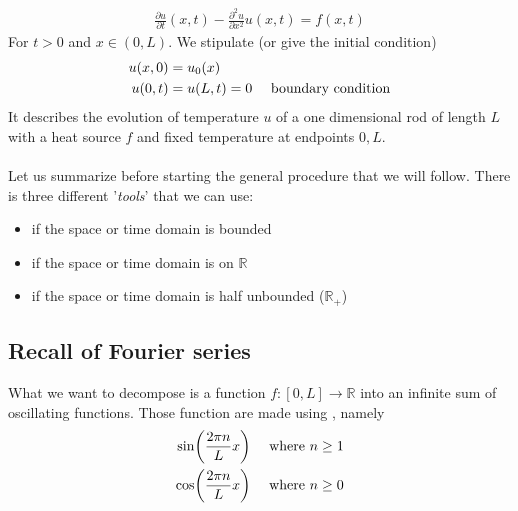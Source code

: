\begin{align*} 
	\frac{\partial u}{\partial t} \left(x, t\right) - \frac{\partial^2 u}{\partial x^2} u\left(x, t\right) = f\left(x, t\right)
\end{align*}
For $t > 0$ and $x \in \left(0, L\right)$. We stipulate (or give the initial condition)
\begin{align*} 
	u\left(x, 0\right) &= u_0\left(x\right)\\
	u\left(0, t\right) &= u\left(L, t\right) = 0 \mathspace \text{ boundary condition}
\end{align*}
It describes the evolution of temperature $u$ of a one dimensional rod of length $L$ with a heat source $f$ and fixed temperature at endpoints $0, L$.\\
$ $\\
Let us summarize before starting the general procedure that we will follow. There is three different '\textit{tools}' that we can use:
\begin{itemize}
    \item {} if the space or time domain is bounded
    \item {} if the space or time domain is on $ \mathbb{R}$
    \item {} if the space or time domain is half unbounded ($ \mathbb{R}_+$)
\end{itemize}

\subsection{Recall of Fourier series}
What we want to decompose is a function $f: \left[0, L\right] \to \mathbb{R}$ into an infinite sum of oscillating functions. Those function are made using , namely 
\begin{align*} 
	\sin\left(\frac{2\pi n}{L}x\right) \mathspace \text{ where }n \geq 1 \\
	\cos \left(\frac{2\pi n}{L}x\right) \mathspace \text{ where }n \geq 0
\end{align*}


